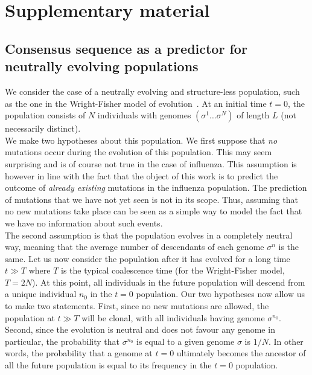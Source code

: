 \documentclass[reprint,amsmath,amssymb,superscriptaddress,showpacs,pre]{revtex4-1}
\begin{document}
\section*{Supplementary material} %
\label{sec:supplementary_material}

\subsection{Consensus sequence as a predictor for neutrally evolving populations} %
\label{sub:consensus_sequence_as_a_predictor}
	
	We consider the case of a neutrally evolving and structure-less population, such as the one in the Wright-Fisher model of evolution~\cite{10.1080/10635150500354860}. At an initial time $t=0$, the population consists of $N$ individuals with genomes $(\sigma^1\ldots\sigma^N)$ of length $L$ (not necessarily distinct). \\
	We make two hypotheses about this population. We first suppose that \emph{no} mutations occur during the evolution of this population. This may seem surprising and is of course not true in the case of influenza. This assumption is however in line with the fact that the object of this work is to predict the outcome of \emph{already existing} mutations in the influenza population. The prediction of mutations that we have not yet seen is not in its scope. Thus, assuming that no new mutations take place can be seen as a simple way to model the fact that we have no information about such events. \\
	The second assumption is that the population evolves in a completely neutral way, meaning that the average number of descendants of each genome $\sigma^n$ is the same. Let us now consider the population after it has evolved for a long time $t\gg T$ where $T$ is the typical coalescence time (for the Wright-Fisher model, $T=2N$). At this point, all individuals in the future population will descend from a unique individual $n_0$ in the $t=0$ population. Our two hypotheses now allow us to make two statements. First, since no new mutations are allowed, the population at $t\gg T$ will be clonal, with all individuals having genome $\sigma^{n_0}$. Second, since the evolution is neutral and does not favour any genome in particular, the probability that $\sigma^{n_0}$ is equal to a given genome $\sigma$ is $1/N$. In other words, the probability that a genome at $t=0$ ultimately becomes the ancestor of all the future population is equal to its frequency in the $t=0$ population. \\
\end{document}
